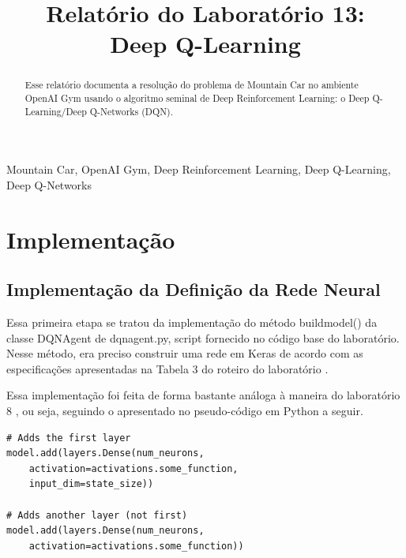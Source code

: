 \documentclass[conference]{IEEEtran}
\begin{document}
\title{Relatório do Laboratório 13: \\ Deep Q-Learning\\
}

\author{
}

\maketitle

\begin{abstract}
Esse relatório documenta a resolução do problema de Mountain Car no ambiente OpenAI Gym usando o algoritmo seminal de Deep Reinforcement Learning: o Deep Q-Learning/Deep Q-Networks (DQN).
\end{abstract}

\begin{IEEEkeywords}
Mountain Car, OpenAI Gym, Deep Reinforcement Learning, Deep Q-Learning, Deep Q-Networks
\end{IEEEkeywords}

\section{Implementação}

	\subsection{Implementação da Definição da Rede Neural}
	
	Essa primeira etapa se tratou da implementação do método build\underline{\space}model() da classe DQNAgent de dqn\underline{\space}agent.py, script fornecido no código base do laboratório. Nesse método, era preciso construir uma rede em Keras de acordo com as especificações apresentadas na Tabela 3 do roteiro do laboratório \cite{roteiro}.
	
	Essa implementação foi feita de forma bastante análoga à maneira do laboratório 8 \cite{roteiro8}, ou seja, seguindo o apresentado no pseudo-código em Python a seguir.
	
\begin{lstlisting}
# Adds the first layer
model.add(layers.Dense(num_neurons,
	activation=activations.some_function,
	input_dim=state_size))

# Adds another layer (not first)
model.add(layers.Dense(num_neurons,
	activation=activations.some_function))
\end{lstlisting}
\end{document}
